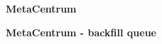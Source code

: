 {
\begin{frame}[plain]
\begin{minipage}[t][\textheight]{\textwidth}
	\color{white}\textbf{MetaCentrum}
\end{minipage}
\end{frame}
}

{
\begin{frame}[plain]
\begin{minipage}[t][\textheight]{\textwidth}
	\color{white}\textbf{MetaCentrum - backfill queue}
\end{minipage}
\end{frame}
}

